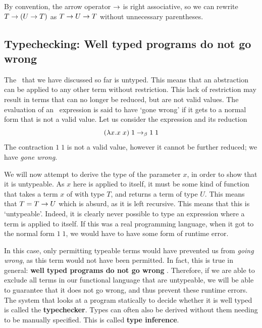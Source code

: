 By convention, the arrow operator $\rightarrow$ is right associative, so we can rewrite \(T \rightarrow (U \rightarrow T)\) as \(T \rightarrow U \rightarrow T\) without unnecessary parentheses. 



\subsection{Typechecking: Well typed programs do not go wrong}
The \lcalc\ that we have discussed so far is untyped. This means that an abstraction can be applied to any other term without restriction. This lack of restriction may result in terms that can no longer be reduced, but are not valid values. The evaluation of an \lcalc\ expression is said to have `gone wrong' if it gets to a normal form that is not a valid value.
Let us consider the expression and its reduction
\[
(\lambda x. x\;x) \;1 \rightarrow_\beta 1\;1
\]
\noindent The contraction $1\;1$ is not a valid value, however it cannot be further reduced; we have \textit{gone wrong}.

We will now attempt to derive the type of the parameter $x$, in order to show that it is untypeable.
As $x$ here is applied to itself, it must be some kind of function that takes a term $x$ of with type $T$, and returns a term of type $U$. This means that $T = T \rightarrow U$ which is absurd, as it is left recursive. This means that this is `untypeable'. Indeed, it is clearly never possible to type an expression where a term is applied to itself. If this was a real programming language, when it got to the normal form \(1\;1\), we would have to have some form of runtime error. 

In this case, only permitting typeable terms would have prevented us from \textit{going wrong}, as this term would not have been permitted. In fact, this is true in general: \textbf{well typed programs do not go wrong} \cite{MILNER1978348}. Therefore, if we are able to exclude all terms in our functional language that are untypeable, we will be able to guarantee that it does not go wrong, and thus prevent these runtime errors. The system that looks at a program statically to decide whether it is well typed is called the \textbf{typechecker}. Types can often also be derived without them needing to be manually specified. This is called \textbf{type inference}.

